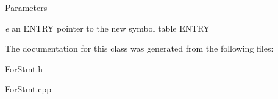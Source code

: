 \begin{DoxyParams}{Parameters}
\item[{\em e}]an ENTRY pointer to the new symbol table ENTRY \end{DoxyParams}


The documentation for this class was generated from the following files:\begin{DoxyCompactItemize}
\item 
ForStmt.h\item 
ForStmt.cpp\end{DoxyCompactItemize}
